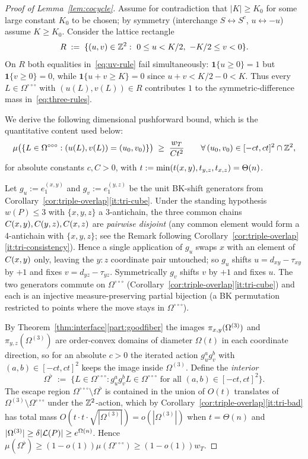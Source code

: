 \begin{proof}[Proof of Lemma~\ref{lem:cocycle}]
Assume for contradiction that $|K|\ge K_0$ for some large constant
$K_0$ to be chosen; by symmetry (interchange $S\leftrightarrow S^c$,
$u\leftrightarrow -u$) assume $K\ge K_0$.
Consider the lattice rectangle
\[
  R\;:=\;\{(u,v)\in\mathbb{Z}^2:\ 0\le u<K/2,\ -K/2\le v<0\}.
\]
On $R$ both equalities in~\eqref{eq:uv-rule} fail
simultaneously: $\mathbf{1}\{u\ge 0\}=1$ but $\mathbf{1}\{v\ge 0\}=0$,
while $\mathbf{1}\{u+v\ge K\}=0$ since $u+v<K/2-0<K$.  Thus every
$L\in\Omega^{\circ\circ\circ}$ with $(u(L),v(L))\in R$ contributes $1$
to the symmetric-difference mass in~\eqref{eq:three-rules}.

We derive the following dimensional pushforward bound, which is the
quantitative content used below:
\begin{equation}\label{eq:pushforward-lb}
  \mu\bigl(\{L\in\Omega^{\circ\circ\circ}:(u(L),v(L))=(u_0,v_0)\}\bigr)
  \;\ge\;\frac{w_T}{Ct^2}
  \qquad\forall\,(u_0,v_0)\in[-ct,ct]^2\cap\mathbb{Z}^2,
\end{equation}
for absolute constants $c,C>0$, with $t:=\min(t(x,y),t_{y,z},t_{x,z})=\Theta(n)$.

Let $g_u:=e_1^{(x,y)}$ and $g_v:=e_1^{(y,z)}$ be the unit BK-shift
generators from Corollary~\ref{cor:triple-overlap}\ref{it:tri-cube}.
Under the standing hypothesis $w(P)\le 3$ with $\{x,y,z\}$ a
3-antichain, the three common chains $C(x,y),C(y,z),C(x,z)$ are
\emph{pairwise disjoint} (any common element would form a 4-antichain
with $\{x,y,z\}$; see the Remark following
Corollary~\ref{cor:triple-overlap}\ref{it:tri-consistency}).  Hence a
single application of $g_u$ swaps $x$ with an element of $C(x,y)$ only,
leaving the $y{:}z$ coordinate pair untouched; so $g_u$ shifts
$u=d_{xy}-\tau_{xy}$ by $+1$ and fixes $v=d_{yz}-\tau_{yz}$.
Symmetrically $g_v$ shifts $v$ by $+1$ and fixes $u$.  The two
generators commute on $\Omega^{\circ\circ\circ}$
(Corollary~\ref{cor:triple-overlap}\ref{it:tri-cube}) and each is an
injective measure-preserving partial bijection (a BK permutation
restricted to points where the move stays in $\Omega^{\circ\circ\circ}$).

By Theorem~\ref{thm:interface}\ref{part:goodfiber} the images
$\pi_{x,y}(\Omega^{(3)})$ and $\pi_{y,z}(\Omega^{(3)})$ are order-convex
domains of diameter $\Omega(t)$ in each coordinate direction, so for
an absolute $c>0$ the iterated action $g_u^a g_v^b$ with
$(a,b)\in[-ct,ct]^2$ keeps the image inside $\Omega^{(3)}$.  Define
the \emph{interior}
\[
  \Omega^\flat\;:=\;\{L\in\Omega^{\circ\circ\circ}:
    g_u^a g_v^b L\in\Omega^{\circ\circ\circ}\text{ for all }(a,b)\in[-ct,ct]^2\}.
\]
The escape region $\Omega^{\circ\circ\circ}\setminus\Omega^\flat$ is
contained in the union of $O(t)$ translates of
$\Omega^{(3)}\setminus\Omega^{\circ\circ\circ}$ under the $\mathbb{Z}^2$-action,
which by Corollary~\ref{cor:triple-overlap}\ref{it:tri-bad} has total
mass $O(t\cdot t\cdot\sqrt{|\Omega^{(3)}|})=o(|\Omega^{(3)}|)$ when
$t=\Theta(n)$ and $|\Omega^{(3)}|\ge\delta|\mathcal{L}(P)|\ge e^{\Omega(n)}$.
Hence $\mu(\Omega^\flat)\ge(1-o(1))\mu(\Omega^{\circ\circ\circ})\ge(1-o(1))w_T$.


\end{proof}
